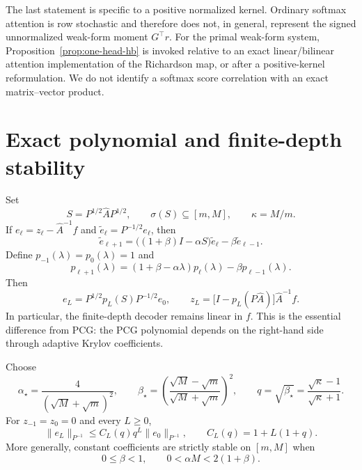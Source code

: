 The last statement is specific to a positive normalized kernel.  Ordinary
softmax attention is row stochastic and therefore does not, in general,
represent the signed unnormalized weak-form moment $G^\top r$.  For the primal
weak-form system, Proposition~\ref{prop:one-head-hb} is invoked relative to an
exact linear/bilinear attention implementation of the Richardson map, or after
a positive-kernel reformulation.  We do not identify a softmax score
correlation with an exact matrix--vector product.

\section{Exact polynomial and finite-depth stability}
\label{sec:hb-polynomial}

Set
\[
 S=P^{1/2}\widehat A P^{1/2},
 \qquad \sigma(S)\subseteq[m,M],
 \qquad \kappa=M/m.
\]
If $e_\ell=z_\ell-\widehat A^{-1}f$ and
$\widetilde e_\ell=P^{-1/2}e_\ell$, then
\begin{equation}
 \widetilde e_{\ell+1}
 =\bigl((1+\beta)I-\alpha S\bigr)\widetilde e_\ell
 -\beta\widetilde e_{\ell-1}.
 \label{eq:hb-error-state}
\end{equation}
Define $p_{-1}(\lambda)=p_0(\lambda)=1$ and
\begin{equation}
 p_{\ell+1}(\lambda)
 =(1+\beta-\alpha\lambda)p_\ell(\lambda)
 -\beta p_{\ell-1}(\lambda).
 \label{eq:hb-polynomial}
\end{equation}
Then
\begin{equation}
 e_L=P^{1/2}p_L(S)P^{-1/2}e_0,
 \qquad
 z_L=\bigl[I-p_L(P\widehat A)\bigr]\widehat A^{-1}f.
 \label{eq:hb-linear-decoder}
\end{equation}
In particular, the finite-depth decoder remains linear in $f$.  This is the
essential difference from PCG: the PCG polynomial depends on the right-hand
side through adaptive Krylov coefficients.

\begin{theorem}
\label{thm:hb-finite-depth}
Choose
\begin{equation}
 \alpha_\star=\frac{4}{(\sqrt M+\sqrt m)^2},
 \qquad
 \beta_\star=
 \left(\frac{\sqrt M-\sqrt m}{\sqrt M+\sqrt m}\right)^2,
 \qquad
 q=\sqrt{\beta_\star}
 =\frac{\sqrt\kappa-1}{\sqrt\kappa+1}.
 \label{eq:hb-optimal-coefficients}
\end{equation}
For $z_{-1}=z_0=0$ and every $L\geq0$,
\begin{equation}
 \|e_L\|_{P^{-1}}
 \leq C_L(q)q^L\|e_0\|_{P^{-1}},
 \qquad
 C_L(q)=1+L(1+q).
 \label{eq:hb-transient-bound}
\end{equation}
More generally, constant coefficients are strictly stable on $[m,M]$ when
\begin{equation}
 0\leq\beta<1,
 \qquad
 0<\alpha M<2(1+\beta).
 \label{eq:hb-stability-region}
\end{equation}
\end{theorem}

